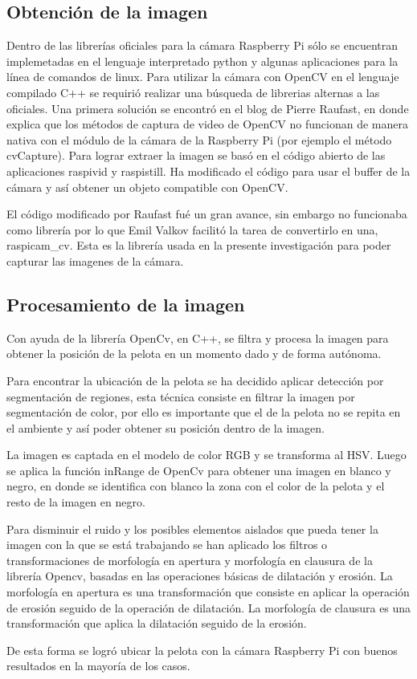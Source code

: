 \subsection{Obtenci\'on de la imagen}\label{extraerImagen}

Dentro de las librerías oficiales para la cámara Raspberry Pi s\'olo se encuentran implemetadas en el lenguaje interpretado python y algunas aplicaciones para la línea de comandos de linux. Para utilizar la cámara con OpenCV en el lenguaje compilado C++ se requirió realizar una búsqueda de librerias alternas a las oficiales. Una primera solución se encontró en el blog de Pierre Raufast, en donde explica que los métodos de captura de video de OpenCV no funcionan de manera nativa con el m\'odulo de la cámara de la Raspberry Pi (por ejemplo el método cvCapture). Para lograr extraer la imagen se basó en el código abierto de las aplicaciones raspivid y raspistill. Ha modificado el código para usar el buffer de la cámara y así obtener un objeto compatible con OpenCV. 

El código modificado por Raufast fué un gran avance, sin embargo no funcionaba como librería por lo que Emil Valkov facilitó la tarea de convertirlo en una, raspicam\_cv. Esta es la librería usada en la presente investigación para poder capturar las imagenes de la cámara. 

\subsection{Procesamiento de la imagen}\label{procesarImagen}

Con ayuda de la librería OpenCv, en C++, se filtra y procesa la imagen para obtener la posición de la pelota en un momento dado y de forma autónoma. 

Para encontrar la ubicación de la pelota  se ha decidido aplicar detección por segmentación de regiones, esta técnica consiste en filtrar la imagen por segmentaci\'on de color, por ello es importante que el de la pelota no se repita en el ambiente y así poder obtener su posición dentro de la imagen.

La imagen es captada en el modelo de color RGB y se transforma al HSV. Luego se aplica la función inRange de OpenCv para obtener una imagen en blanco y negro, en donde se identifica con blanco la zona con el color de la pelota y el resto de la imagen en negro. 

Para disminuir el ruido y los posibles elementos aislados que pueda tener la imagen con la que se está trabajando se han aplicado los filtros o transformaciones de morfología en apertura y morfología en clausura de la librería Opencv, basadas en las operaciones básicas de dilatación y erosión. La morfología en apertura es una transformación que consiste en aplicar la operación de erosión seguido de la operación de dilatación. La morfología de clausura es una transformación que aplica la dilatación seguido de la erosión.

De esta forma se logró ubicar la pelota con la cámara Raspberry Pi con buenos resultados en la mayoría de los casos. 
 


